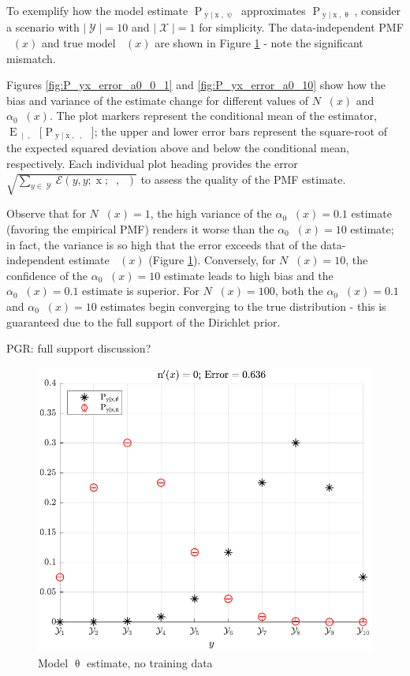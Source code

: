 \documentclass[12pt]{report}
\newcommand{\todohigh}[1]{\todo[inline,color=red!50,linecolor=red]{#1}}
\DeclareMathOperator{\xrm}{\mathrm{x}}
\DeclareMathOperator{\yrm}{\mathrm{y}}
\DeclareMathOperator{\Prm}{\mathrm{P}}
\DeclareMathOperator{\Erm}{\mathrm{E}}
\DeclareMathOperator{\Xcal}{\mathcal{X}}
\DeclareMathOperator{\Ycal}{\mathcal{Y}}
\DeclareMathOperator{\upthetac}{\uptheta_\text{c}}
\DeclareMathOperator{\uppsim}{\uppsi_\text{m}}
\DeclareMathOperator{\uppsic}{\uppsi_\text{c}}
\DeclareMathOperator{\alpham}{\alpha_\text{m}}
\DeclareMathOperator{\alphac}{\alpha_\text{c}}
\begin{document}
\todohigh{REDO FIGURES for new formulae?!}

To exemplify how the model estimate $\Prm_{\yrm | \xrm,\uppsi}$ approximates $\Prm_{\yrm | \xrm,\uptheta}$, consider a scenario with $|\Ycal| = 10$ and $|\Xcal| = 1$ for simplicity. The data-independent PMF $\alphac(x)$ and true model $\upthetac(x)$ are shown in Figure \ref{fig:P_yx_error_N_0} - note the significant mismatch. 


Figures \ref{fig:P_yx_error_a0_0_1} and \ref{fig:P_yx_error_a0_10} show how the bias and variance of the estimate change for different values of $N \uppsim(x)$ and $\alpha_0 \alpham(x)$. The plot markers represent the conditional mean of the estimator, $\Erm_{\uppsic | \uppsim,\upthetac}\big[ \Prm_{\yrm | \xrm,\uppsim,\uppsic} \big]$; the upper and lower error bars represent the square-root of the expected squared deviation above and below the conditional mean, respectively. Each individual plot heading provides the error $\sqrt{\sum_{y \in \Ycal} \mathcal{E}(y,y ; \xrm;\uppsim,\upthetac)}$ to assess the quality of the PMF estimate. 

Observe that for $N \uppsim(x) = 1$, the high variance of the $\alpha_0 \alpham(x) = 0.1$ estimate (favoring the empirical PMF) renders it worse than the $\alpha_0 \alpham(x) = 10$ estimate; in fact, the variance is so high that the error exceeds that of the data-independent estimate $\alphac(x)$ (Figure \ref{fig:P_yx_error_N_0}). Conversely, for $N \uppsim(x) = 10$, the confidence of the $ \alpha_0 \alpham(x) = 10$ estimate leads to high bias and the $ \alpha_0 \alpham(x) = 0.1$ estimate is superior. For $N \uppsim(x) = 100$, both the $ \alpha_0 \alpham(x) = 0.1$ and $ \alpha_0 \alpham(x) = 10$ estimates begin converging to the true distribution - this is guaranteed due to the full support of the Dirichlet prior.

PGR: full support discussion?


\begin{figure}
\centering
\includegraphics[width=0.7\linewidth]{P_yx_error_N_0.pdf}
\caption{Model $\uptheta$ estimate, no training data}
\label{fig:P_yx_error_N_0}
\end{figure}
\end{document}
